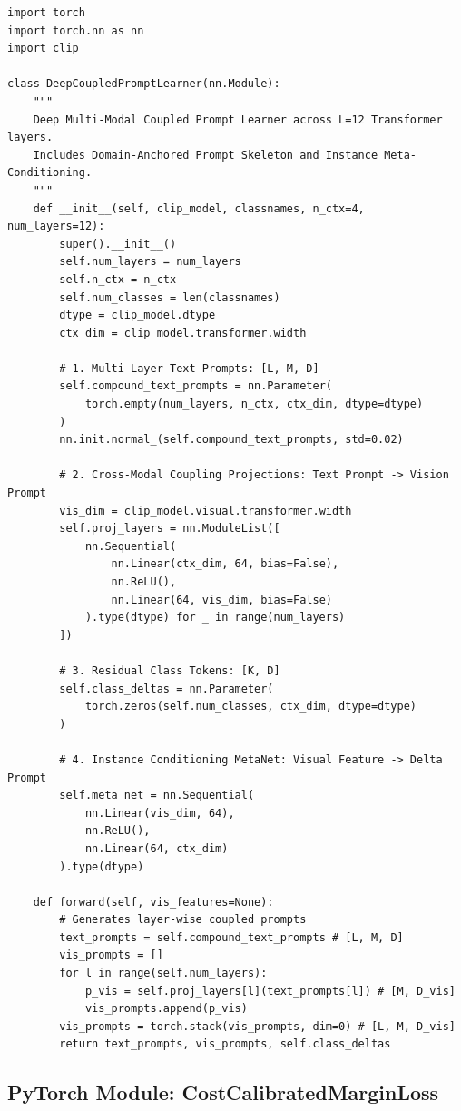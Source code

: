 \documentclass[letterpaper,11pt,leqno]{article}
\begin{document}
\begin{verbatim}
import torch
import torch.nn as nn
import clip

class DeepCoupledPromptLearner(nn.Module):
    """
    Deep Multi-Modal Coupled Prompt Learner across L=12 Transformer layers.
    Includes Domain-Anchored Prompt Skeleton and Instance Meta-Conditioning.
    """
    def __init__(self, clip_model, classnames, n_ctx=4, num_layers=12):
        super().__init__()
        self.num_layers = num_layers
        self.n_ctx = n_ctx
        self.num_classes = len(classnames)
        dtype = clip_model.dtype
        ctx_dim = clip_model.transformer.width
        
        # 1. Multi-Layer Text Prompts: [L, M, D]
        self.compound_text_prompts = nn.Parameter(
            torch.empty(num_layers, n_ctx, ctx_dim, dtype=dtype)
        )
        nn.init.normal_(self.compound_text_prompts, std=0.02)
        
        # 2. Cross-Modal Coupling Projections: Text Prompt -> Vision Prompt
        vis_dim = clip_model.visual.transformer.width
        self.proj_layers = nn.ModuleList([
            nn.Sequential(
                nn.Linear(ctx_dim, 64, bias=False),
                nn.ReLU(),
                nn.Linear(64, vis_dim, bias=False)
            ).type(dtype) for _ in range(num_layers)
        ])
        
        # 3. Residual Class Tokens: [K, D]
        self.class_deltas = nn.Parameter(
            torch.zeros(self.num_classes, ctx_dim, dtype=dtype)
        )
        
        # 4. Instance Conditioning MetaNet: Visual Feature -> Delta Prompt
        self.meta_net = nn.Sequential(
            nn.Linear(vis_dim, 64),
            nn.ReLU(),
            nn.Linear(64, ctx_dim)
        ).type(dtype)
        
    def forward(self, vis_features=None):
        # Generates layer-wise coupled prompts
        text_prompts = self.compound_text_prompts # [L, M, D]
        vis_prompts = []
        for l in range(self.num_layers):
            p_vis = self.proj_layers[l](text_prompts[l]) # [M, D_vis]
            vis_prompts.append(p_vis)
        vis_prompts = torch.stack(vis_prompts, dim=0) # [L, M, D_vis]
        return text_prompts, vis_prompts, self.class_deltas
\end{verbatim}

\subsection{PyTorch Module: CostCalibratedMarginLoss}
\end{document}
